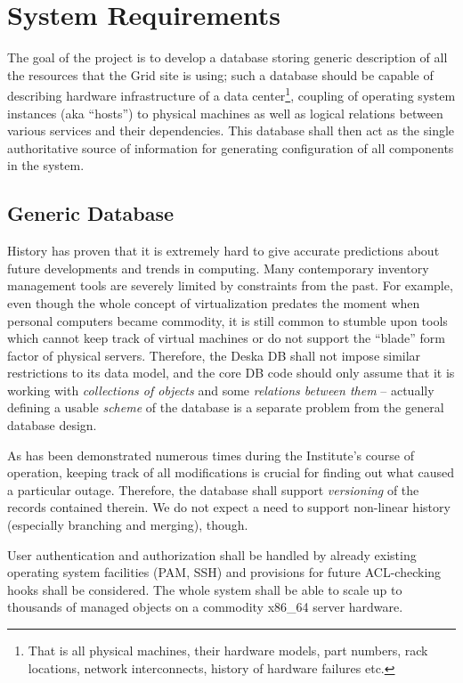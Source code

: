 \documentclass{article}
\begin{document}
\section{System Requirements}

The goal of the project is to develop a database storing generic description of all the resources that the Grid site is using;
such a database should be capable of describing hardware infrastructure of a data center\footnote{That is all physical machines,
their hardware models, part numbers, rack locations, network interconnects, history of hardware failures etc.}, coupling of
operating system instances (aka ``hosts'') to physical machines as well as logical relations between various services and their
dependencies.  This database shall then act as the single authoritative source of information for generating configuration of all
components in the system.

\subsection{Generic Database}

History has proven that it is extremely hard to give accurate predictions about future developments and trends in computing.  Many
contemporary inventory management tools are severely limited by constraints from the past.  For example, even though the whole
concept of virtualization predates the moment when personal computers became commodity, it is still common to stumble upon tools
which cannot keep track of virtual machines or do not support the ``blade'' form factor of physical servers.  Therefore, the Deska
DB shall not impose similar restrictions to its data model, and the core DB code should only assume that it is working with {\em
collections of objects} and some {\em relations between them} -- actually defining a usable {\em scheme} of the database is a
separate problem from the general database design.

As has been demonstrated numerous times during the Institute's course of operation, keeping track of all modifications is crucial
for finding out what caused a particular outage.  Therefore, the database shall support {\em versioning} of the records contained
therein.  We do not expect a need to support non-linear history (especially branching and merging), though.

User authentication and authorization shall be handled by already existing operating system facilities (PAM, SSH) and provisions
for future ACL-checking hooks shall be considered.  The whole system shall be able to scale up to thousands of managed objects on
a commodity x86\_64 server hardware.
\end{document}
